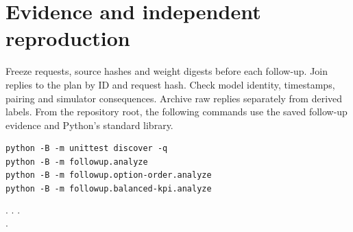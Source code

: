 \documentclass[11pt]{article}
\begin{document}
\section{Evidence and independent reproduction}
Freeze requests, source hashes and weight digests before each follow-up. Join replies to the plan by ID and request hash. Check model identity, timestamps, pairing and simulator consequences. Archive raw replies separately from derived labels. From the repository root, the following commands use the saved follow-up evidence and Python's standard library.
{\small\begin{verbatim}
python -B -m unittest discover -q
python -B -m followup.analyze
python -B -m followup.option-order.analyze
python -B -m followup.balanced-kpi.analyze
\end{verbatim}}
\noindent{}
\enspace$\cdot$\enspace{}
\enspace$\cdot$\enspace{}
\enspace$\cdot$\enspace{}\\
\enspace$\cdot$\enspace{}
\end{document}
